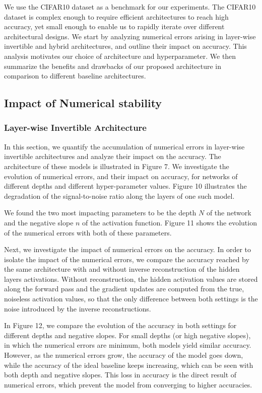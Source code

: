\documentclass[twocolumn]{bmcart}
\begin{document}
We use the CIFAR10 dataset as a benchmark for our experiments.
The CIFAR10 dataset is complex enough to require efficient architectures to reach high accuracy,
yet small enough to enable us to rapidly iterate over different architectural designs.
We start by analyzing numerical errors arising in layer-wise invertible and hybrid architectures,
and outline their impact on accuracy.
This analysis motivates our choice of architecture and hyperparameter.
We then summarize the benefits and drawbacks of our proposed architecture in comparison to different baseline architectures.

\subsection{Impact of Numerical stability}

\subsubsection{Layer-wise Invertible Architecture}

In this section, we quantify the accumulation of numerical errors in layer-wise invertible architectures and analyze their impact on the accuracy.
The architecture of these models is illustrated in Figure 7.
We investigate the evolution of numerical errors, and their impact on accuracy, for networks of different depths and different hyper-parameter values.
Figure 10 illustrates the degradation of the signal-to-noise ratio along the layers of one such model.

We found the two most impacting parameters to be the depth $N$ of the network and the negative slope $n$ of the activation function.
Figure 11 shows the evolution of the numerical errors with both of these parameters.

Next, we investigate the impact of numerical errors on the accuracy.
In order to isolate the impact of the numerical errors,
we compare the accuracy reached by the same architecture with and without inverse reconstruction of the hidden layers activations.
Without reconstruction, the hidden activation values are stored along the forward pass and the gradient updates are computed from the true,
noiseless activation values, so that the only difference between both settings is the noise introduced by the inverse reconstructions.

In Figure 12, we compare the evolution of the accuracy in both settings for different depths and negative slopes.
For small depths (or high negative slopes), in which the numerical errors are minimum, both models yield similar accuracy.
However, as the numerical errors grow, the accuracy of the model goes down,
while the accuracy of the ideal baseline keeps increasing,
which can be seen with both depth and negative slopes.
This loss in accuracy is the direct result of numerical errors,
which prevent the model from converging to higher accuracies.
\end{document}
